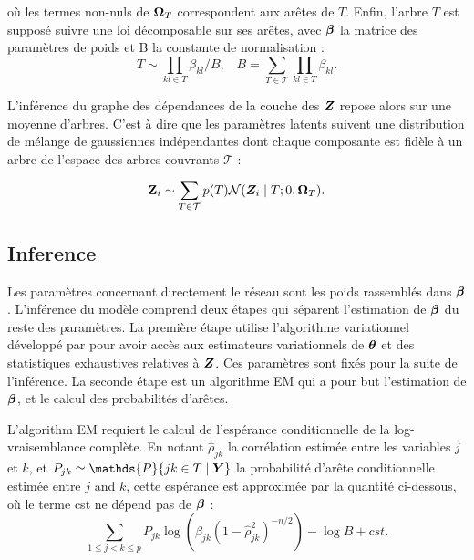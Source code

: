  où les termes non-nuls de ${\boldsymbol{\Omega}}_T$ correspondent aux arêtes de $T$.  Enfin, l'arbre $T$ est supposé suivre une loi décomposable sur ses arêtes, avec ${\boldsymbol{\beta}}$ la matrice des paramètres de poids et B la constante de normalisation :
 $$ T\sim \prod_{kl\in T} \beta_{kl} / B, \;\;\;  B= \sum_{T\in\mathcal{T}} \prod_{kl \in T} \beta_{kl}.$$
 
L'inférence du graphe des dépendances de la couche des ${\boldsymbol{Z}}$ repose alors sur une moyenne d'arbres. C'est à dire que les paramètres latents suivent une distribution de mélange de gaussiennes indépendantes dont chaque composante est fidèle à un arbre de l'espace des arbres couvrants $\mathcal{T}$ :

$${\bf Z}_i \sim \sum_{T\in \mathcal{T}} p(T) \mathcal{N} ({\boldsymbol{Z}}_i\mid T; 0, {\boldsymbol{\Omega}}_T).$$


\subsection*{Inference}

Les paramètres concernant directement le réseau sont les poids rassemblés dans ${\boldsymbol{\beta}}$. L'inférence du modèle comprend deux étapes qui séparent  l'estimation de ${\boldsymbol{\beta}}$ du reste des paramètres. La première étape utilise l'algorithme variationnel développé par \citet{CMR18} pour avoir accès aux estimateurs variationnels de  ${\boldsymbol{\theta}}$ et des statistiques exhaustives relatives à ${\boldsymbol{Z}}$. Ces paramètres sont fixés pour la suite de l'inférence. La seconde étape est un algorithme EM qui a pour but l'estimation de ${\boldsymbol{\beta}}$, et le calcul des probabilités d'arêtes.

L'algorithm EM requiert le calcul de l'espérance conditionnelle de la log-vraisemblance complète. En notant $\widehat{\rho}_{jk}$ la corrélation estimée entre les variables $j$ et $k$, et $P_{jk}\simeq\mathds{P}\{jk\in T\mid \Ybf\}$ la probabilité d'arête conditionnelle estimée entre $j$ and $k$, cette espérance est approximée par la quantité ci-dessous, où le terme cst ne dépend pas de ${\boldsymbol{\beta}}$ :
$$\sum_{1\leq j < k \leq p} P_{jk} \log \left(\beta_{jk} (1-\widehat{\rho}_{jk}^2)^{-n/2} \right) -\log B + cst.$$


